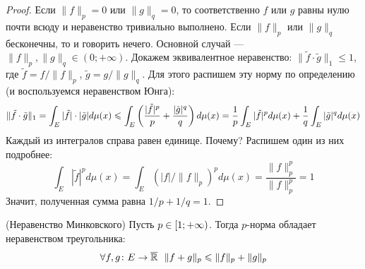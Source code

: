 \begin{proof}
	Если $\|f\|_p = 0$ или $\|g\|_q = 0$, то соответственно $f$ или $g$ равны нулю почти всюду и неравенство тривиально выполнено. Если $\|f\|_p$ или $\|g\|_q$ бесконечны, то и говорить нечего. Основной случай --- $\|f\|_p, \|g\|_q \in (0; +\infty)$. Докажем эквивалентное неравенство: $\|\tilde{f} \cdot \tilde{g}\|_1 \le 1$, где $\tilde{f} = f / \|f\|_p$, $\tilde{g} = g / \|g\|_q$. Для этого распишем эту норму по определению (и воспользуемся неравенством Юнга):
	\[
		\|\tilde{f} \cdot \tilde{g}\|_1 = \int_E |\tilde{f}| \cdot |\tilde{g}|d\mu(x) \leqslant \int_E \left(\frac{|\tilde{f}|^p}{p} + \frac{|\tilde{g}|^q}{q}\right)d\mu(x) = \frac{1}{p} \int_E |\tilde{f}|^pd\mu(x) + \frac{1}{q} \int_E |\tilde{g}|^qd\mu(x)
	\]
	Каждый из интегралов справа равен единице. Почему? Распишем один из них подробнее:
	\[
		\int_E |\tilde{f}|^pd\mu(x) = \int_E (|f| / \|f\|_p)^pd\mu(x) = \frac{\|f\|_p^p}{\|f\|_p^p} = 1
	\]
	Значит, полученная сумма равна $1/p + 1/q = 1$.  
\end{proof}

\begin{theorem} (Неравенство Минковского)
	Пусть $p \in \left[1; +\infty\right)$. Тогда $p$-норма обладает неравенством треугольника:
	\[
		\forall f, g \colon E \to \overline{\mathbb{R}}\ \ \|f + g\|_p \leqslant \|f\|_p + \|g\|_p
	\]
\end{theorem}

